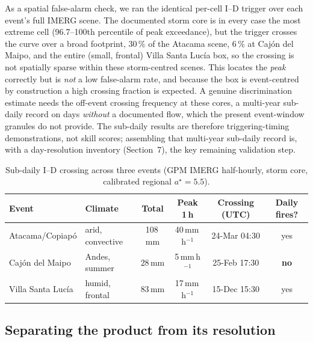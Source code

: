 \documentclass[authoryear,preprint,review,12pt]{elsarticle}
\begin{document}
As a spatial false-alarm check, we ran the identical per-cell I--D trigger over each
event's full IMERG scene. The documented storm core is in every case the most
extreme cell (96.7--100th percentile of peak exceedance), but the trigger crosses
the curve over a broad footprint, 30\,\% of the Atacama scene, 6\,\% at Caj\'on del
Maipo, and the entire (small, frontal) Villa Santa Luc\'ia box, so the crossing is
not spatially sparse within these storm-centred scenes. This locates the \emph{peak}
correctly but is \emph{not} a low false-alarm rate, and because the box is
event-centred by construction a high crossing fraction is expected. A genuine
discrimination estimate needs the off-event crossing frequency at these cores, a
multi-year sub-daily record on days \emph{without} a documented flow, which the
present event-window granules do not provide. The sub-daily results are therefore
triggering-timing demonstrations, not skill scores; assembling that multi-year
sub-daily record is, with a day-resolution inventory (Section~7), the key remaining
validation step.

\begin{table}[ht]
\centering
\caption{Sub-daily I--D crossing across three events (GPM IMERG half-hourly, storm
core, calibrated regional $a^\star=5.5$).}
\label{tab:multievent}
\begin{tabular}{@{}llcccc@{}}
\toprule
Event & Climate & Total & Peak 1\,h & Crossing (UTC) & Daily fires? \\
\midrule
Atacama/Copiap\'o & arid, convective & 108\,mm & 40\,mm\,h$^{-1}$ & 24-Mar 04:30 & yes \\
Caj\'on del Maipo & Andes, summer & 28\,mm & 5\,mm\,h$^{-1}$ & 25-Feb 17:30 & \textbf{no} \\
Villa Santa Luc\'ia & humid, frontal & 83\,mm & 17\,mm\,h$^{-1}$ & 15-Dec 15:30 & yes \\
\bottomrule
\end{tabular}
\end{table}

\subsection{Separating the product from its resolution}
\label{sec:singlefactor}
\end{document}
